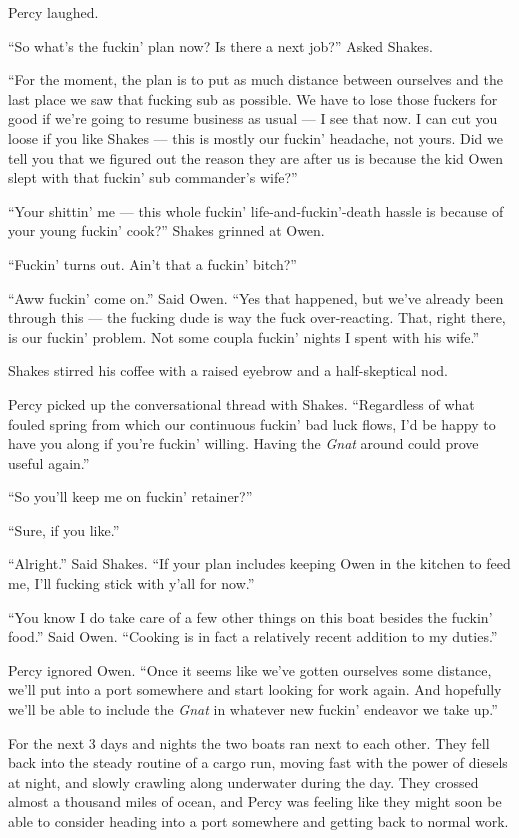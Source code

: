 \documentclass[]{scrbook}
\begin{document}
Percy laughed.

``So what's the fuckin' plan now? Is there a next job?'' Asked Shakes.

``For the moment, the plan is to put as much distance between ourselves
and the last place we saw that fucking sub as possible. We have to lose
those fuckers for good if we're going to resume business as usual --- I
see that now. I can cut you loose if you like Shakes --- this is mostly
our fuckin' headache, not yours. Did we tell you that we figured out the
reason they are after us is because the kid Owen slept with that fuckin'
sub commander's wife?''

``Your shittin' me --- this whole fuckin' life-and-fuckin'-death hassle
is because of your young fuckin' cook?'' Shakes grinned at Owen.

``Fuckin' turns out. Ain't that a fuckin' bitch?''

``Aww fuckin' come on.'' Said Owen. ``Yes that happened, but we've
already been through this --- the fucking dude is way the fuck
over-reacting. That, right there, is our fuckin' problem. Not some
coupla fuckin' nights I spent with his wife.''

Shakes stirred his coffee with a raised eyebrow and a half-skeptical
nod.

Percy picked up the conversational thread with Shakes. ``Regardless of
what fouled spring from which our continuous fuckin' bad luck flows, I'd
be happy to have you along if you're fuckin' willing. Having the
\emph{Gnat} around could prove useful again.''

``So you'll keep me on fuckin' retainer?''

``Sure, if you like.''

``Alright.'' Said Shakes. ``If your plan includes keeping Owen in the
kitchen to feed me, I'll fucking stick with y'all for now.''

``You know I do take care of a few other things on this boat besides the
fuckin' food.'' Said Owen. ``Cooking is in fact a relatively recent
addition to my duties.''

Percy ignored Owen. ``Once it seems like we've gotten ourselves some
distance, we'll put into a port somewhere and start looking for work
again. And hopefully we'll be able to include the \emph{Gnat} in
whatever new fuckin' endeavor we take up.''

For the next 3 days and nights the two boats ran next to each other.
They fell back into the steady routine of a cargo run, moving fast with
the power of diesels at night, and slowly crawling along underwater
during the day. They crossed almost a thousand miles of ocean, and Percy
was feeling like they might soon be able to consider heading into a port
somewhere and getting back to normal work.
\end{document}
